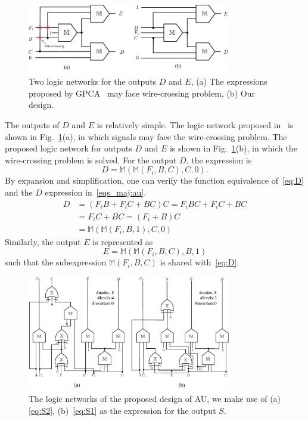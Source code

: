 \documentclass[9pt,journal,compsoc]{IEEEtran}
\begin{document}
\begin{figure}[b]
\centering
\includegraphics[width=3.5in]{fig/wire_cross.pdf}\vspace{-2ex}
\caption{Two logic networks for the outputs $D$ and $E$, (a) The expressions proposed by GPCA\hspace{-0.2em}~\cite{2} may face wire-crossing problem, (b) Our design.}
\label{fig:wire_cross}
\end{figure}

The outputs of $D$ and $E$ is relatively simple. The logic network proposed in~\cite{2} is shown in Fig.~\ref{fig:wire_cross}(a), in which signals may face the wire-crossing problem. The proposed logic network for outputs $D$ and $E$ is shown in Fig.~\ref{fig:wire_cross}(b), in which the wire-crossing problem is solved.
For the output $D$, the expression is
\begin{equation}\label{eq:D}
D = \mathbb{M}(\mathbb{M}(F_{i}, B, C), C, 0).
\end{equation}
By expansion and simplification, one can verify the function equivalence of~\eqref{eq:D} and the $D$ expression in~\eqref{eqs_maj:au}.
\begin{equation}
\begin{split}
D &= (F_iB + F_iC + BC)C = F_iBC + F_iC + BC \\
  &= F_iC + BC = (F_i + B)C \\
  &= \mathbb{M}(\mathbb{M}(F_i, B, 1), C, 0 )
\end{split}
\end{equation}
Similarly, the output $E$ is represented as
\begin{equation}\label{eq:E}
E = \mathbb{M}(\mathbb{M}(F_{i}, B, C), B, 1)
\end{equation}
such that the subexpression $\mathbb{M}(F_{i}, B, C)$ is shared with~\eqref{eq:D}.


\begin{figure}[t]
\centering
\includegraphics[width=3.5in]{fig/au_netlist.pdf}\vspace{-2ex}
\caption{The logic networks of the proposed design of AU, we make use of (a) \eqref{eq:S2}, (b)~\eqref{eq:S1} as the expression for the output $S$.\vspace{-1ex}}\vspace{-2ex}
\label{fig:au_netlist}
\end{figure}
\end{document}
